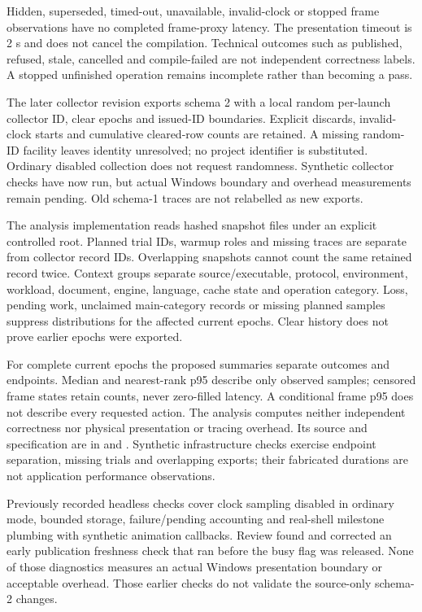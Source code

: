 Hidden, superseded, timed-out, unavailable, invalid-clock or stopped frame
observations have no completed frame-proxy latency. The presentation timeout
is 2 s and does not cancel the compilation. Technical outcomes such as
published, refused, stale, cancelled and compile-failed are not independent
correctness labels. A stopped unfinished operation remains incomplete rather
than becoming a pass.

The later collector revision exports schema 2 with a local random
per-launch collector ID, clear epochs and issued-ID boundaries. Explicit
discards, invalid-clock starts and cumulative cleared-row counts are retained.
A missing random-ID facility leaves identity unresolved; no project identifier
is substituted. Ordinary disabled collection does not request randomness.
Synthetic collector checks have now run, but actual Windows boundary and
overhead measurements remain pending. Old schema-1 traces are not relabelled
as new exports.

The analysis implementation reads hashed snapshot files under an explicit
controlled root. Planned trial IDs, warmup roles and missing traces are
separate from collector record IDs. Overlapping snapshots cannot count the
same retained record twice. Context groups separate source/executable,
protocol, environment, workload, document, engine, language, cache state and
operation category. Loss, pending work, unclaimed main-category records or
missing planned samples suppress distributions for the affected current
epochs. Clear history does not prove earlier epochs were exported.

For complete current epochs the proposed summaries separate outcomes and
endpoints. Median and nearest-rank p95 describe only observed samples;
censored frame states retain counts, never zero-filled latency. A conditional
frame p95 does not describe every requested action. The analysis computes
neither independent correctness nor physical presentation or tracing overhead.
Its source and specification are in 
and . Synthetic infrastructure checks exercise
endpoint separation, missing trials and overlapping exports; their fabricated
durations are not application performance observations.

Previously recorded headless checks cover clock sampling disabled in ordinary mode, bounded storage,
failure/pending accounting and real-shell milestone plumbing with synthetic
animation callbacks. Review found and corrected an early publication freshness
check that ran before the busy flag was released. None of those diagnostics
measures an actual Windows presentation boundary or acceptable overhead.
Those earlier checks do not validate the source-only schema-2 changes.

